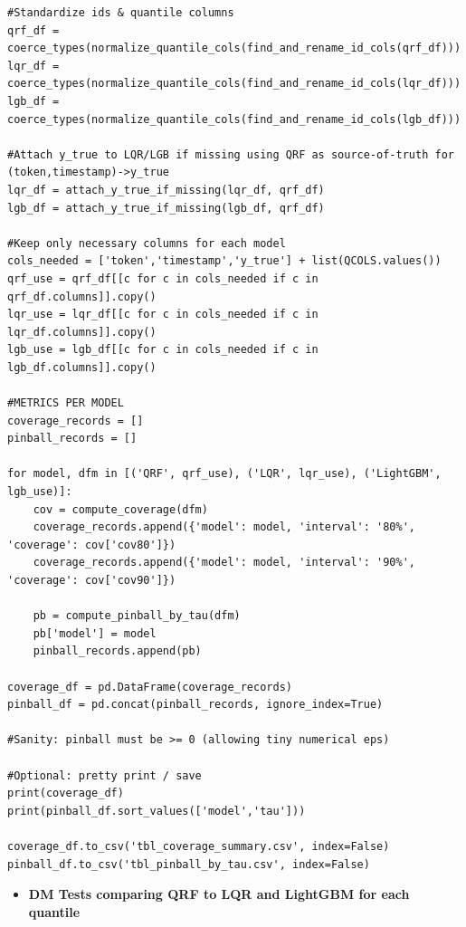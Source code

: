 \documentclass[
  a4paper,
  DIV=11,
  numbers=noendperiod]{scrreprt}
\providecommand{\tightlist}{%
  \setlength{\itemsep}{0pt}\setlength{\parskip}{0pt}}
\begin{document}
\begin{verbatim}
#Standardize ids & quantile columns
qrf_df = coerce_types(normalize_quantile_cols(find_and_rename_id_cols(qrf_df)))
lqr_df = coerce_types(normalize_quantile_cols(find_and_rename_id_cols(lqr_df)))
lgb_df = coerce_types(normalize_quantile_cols(find_and_rename_id_cols(lgb_df)))

#Attach y_true to LQR/LGB if missing using QRF as source-of-truth for (token,timestamp)->y_true
lqr_df = attach_y_true_if_missing(lqr_df, qrf_df)
lgb_df = attach_y_true_if_missing(lgb_df, qrf_df)

#Keep only necessary columns for each model
cols_needed = ['token','timestamp','y_true'] + list(QCOLS.values())
qrf_use = qrf_df[[c for c in cols_needed if c in qrf_df.columns]].copy()
lqr_use = lqr_df[[c for c in cols_needed if c in lqr_df.columns]].copy()
lgb_use = lgb_df[[c for c in cols_needed if c in lgb_df.columns]].copy()

#METRICS PER MODEL 
coverage_records = []
pinball_records = []

for model, dfm in [('QRF', qrf_use), ('LQR', lqr_use), ('LightGBM', lgb_use)]:
    cov = compute_coverage(dfm)
    coverage_records.append({'model': model, 'interval': '80%', 'coverage': cov['cov80']})
    coverage_records.append({'model': model, 'interval': '90%', 'coverage': cov['cov90']})

    pb = compute_pinball_by_tau(dfm)
    pb['model'] = model
    pinball_records.append(pb)

coverage_df = pd.DataFrame(coverage_records)
pinball_df = pd.concat(pinball_records, ignore_index=True)

#Sanity: pinball must be >= 0 (allowing tiny numerical eps)

#Optional: pretty print / save
print(coverage_df)
print(pinball_df.sort_values(['model','tau']))

coverage_df.to_csv('tbl_coverage_summary.csv', index=False)
pinball_df.to_csv('tbl_pinball_by_tau.csv', index=False)
\end{verbatim}

\begin{itemize}
\tightlist
\item
  \textbf{DM Tests comparing QRF to LQR and LightGBM for each quantile}
\end{itemize}
\end{document}
